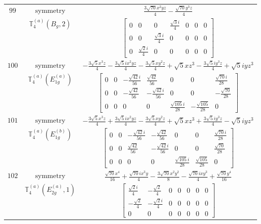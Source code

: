 \documentclass[fleqn,8pt,landscape]{jsarticle}
\begin{document}
\begin{longtable}{ccc}
$ 99 $ & $ \text{symmetry} $ & $ \frac{3 \sqrt{70} x^{2} y z}{4} - \frac{\sqrt{70} y^{3} z}{4} $ \\
$  $ & $ \mathbb{T}_{4}^{(a)}(B_{g},2) $ & $ \begin{bmatrix} 0 & 0 & 0 & \frac{\sqrt{3} i}{4} & 0 & 0 & 0 \\ 0 & 0 & \frac{\sqrt{3} i}{4} & 0 & 0 & 0 & 0 \\ 0 & \frac{\sqrt{2} i}{4} & 0 & 0 & 0 & 0 & 0 \end{bmatrix} $ \\ \hline
$ 100 $ & $ \text{symmetry} $ & $ - \frac{3 \sqrt{5} x^{3} z}{4} - \frac{3 \sqrt{5} i x^{2} y z}{4} - \frac{3 \sqrt{5} x y^{2} z}{4} + \sqrt{5} x z^{3} - \frac{3 \sqrt{5} i y^{3} z}{4} + \sqrt{5} i y z^{3} $ \\
$  $ & $ \mathbb{T}_{4}^{(a)}(E_{1g}^{(a)}) $ & $ \begin{bmatrix} 0 & 0 & - \frac{\sqrt{42} i}{56} & \frac{\sqrt{42}}{56} & 0 & 0 & \frac{\sqrt{70} i}{28} \\ 0 & 0 & - \frac{\sqrt{42}}{56} & - \frac{\sqrt{42} i}{56} & 0 & 0 & - \frac{\sqrt{70}}{28} \\ 0 & 0 & 0 & 0 & \frac{\sqrt{105} i}{28} & - \frac{\sqrt{105}}{28} & 0 \end{bmatrix} $ \\ \hline
$ 101 $ & $ \text{symmetry} $ & $ - \frac{3 \sqrt{5} x^{3} z}{4} + \frac{3 \sqrt{5} i x^{2} y z}{4} - \frac{3 \sqrt{5} x y^{2} z}{4} + \sqrt{5} x z^{3} + \frac{3 \sqrt{5} i y^{3} z}{4} - \sqrt{5} i y z^{3} $ \\
$  $ & $ \mathbb{T}_{4}^{(a)}(E_{1g}^{(b)}) $ & $ \begin{bmatrix} 0 & 0 & - \frac{\sqrt{42} i}{56} & - \frac{\sqrt{42}}{56} & 0 & 0 & \frac{\sqrt{70} i}{28} \\ 0 & 0 & \frac{\sqrt{42}}{56} & - \frac{\sqrt{42} i}{56} & 0 & 0 & \frac{\sqrt{70}}{28} \\ 0 & 0 & 0 & 0 & \frac{\sqrt{105} i}{28} & \frac{\sqrt{105}}{28} & 0 \end{bmatrix} $ \\ \hline
$ 102 $ & $ \text{symmetry} $ & $ \frac{\sqrt{70} x^{4}}{16} + \frac{\sqrt{70} i x^{3} y}{4} - \frac{3 \sqrt{70} x^{2} y^{2}}{8} - \frac{\sqrt{70} i x y^{3}}{4} + \frac{\sqrt{70} y^{4}}{16} $ \\
$  $ & $ \mathbb{T}_{4}^{(a)}(E_{2g}^{(a)},1) $ & $ \begin{bmatrix} \frac{\sqrt{2} i}{4} & - \frac{\sqrt{2}}{4} & 0 & 0 & 0 & 0 & 0 \\ - \frac{\sqrt{2}}{4} & - \frac{\sqrt{2} i}{4} & 0 & 0 & 0 & 0 & 0 \\ 0 & 0 & 0 & 0 & 0 & 0 & 0 \end{bmatrix} $ \\ \hline

\end{longtable}
\end{document}
